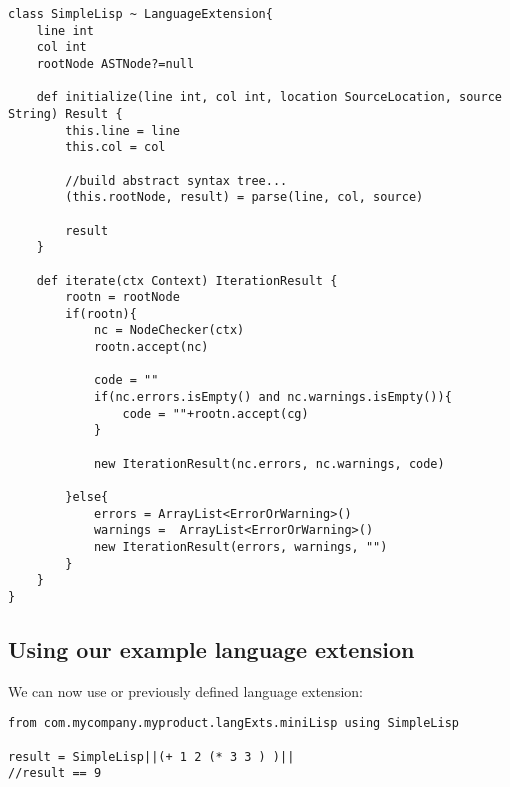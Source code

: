 \documentclass[conc-doc]{subfiles}
\begin{document}
\begin{lstlisting}
class SimpleLisp ~ LanguageExtension{
	line int
	col int
	rootNode ASTNode?=null
	
	def initialize(line int, col int, location SourceLocation, source String) Result {
		this.line = line
		this.col = col
		
		//build abstract syntax tree...
		(this.rootNode, result) = parse(line, col, source)
		
		result
	}
	
	def iterate(ctx Context) IterationResult {
		rootn = rootNode
		if(rootn){
			nc = NodeChecker(ctx)
			rootn.accept(nc)
			
			code = ""
			if(nc.errors.isEmpty() and nc.warnings.isEmpty()){
				code = ""+rootn.accept(cg)
			}
			
			new IterationResult(nc.errors, nc.warnings, code)
			
		}else{
			errors = ArrayList<ErrorOrWarning>()
			warnings =  ArrayList<ErrorOrWarning>()
			new IterationResult(errors, warnings, "")
		}
	}
}
\end{lstlisting}

\subsection{Using our example language extension}
We can now use or previously defined language extension:
\begin{lstlisting}
from com.mycompany.myproduct.langExts.miniLisp using SimpleLisp

result = SimpleLisp||(+ 1 2 (* 3 3 ) )||
//result == 9
\end{lstlisting}
\end{document}
